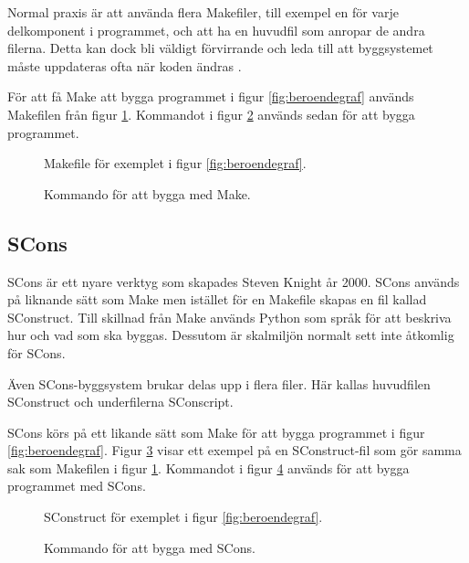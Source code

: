 Normal praxis är att använda flera Makefiler, till exempel en för varje delkomponent i programmet, och att ha en huvudfil som anropar de andra filerna. Detta kan dock bli väldigt förvirrande och leda till att byggsystemet måste uppdateras ofta när koden ändras \citep{recursivemake}.

För att få Make att bygga programmet i figur \ref{fig:beroendegraf} används Makefilen från figur \ref{fig:makefile}. Kommandot i figur \ref{fig:makekommando} används sedan för att bygga programmet.

\begin{figure}[h!]
  
  \caption{Makefile för exemplet i figur \ref{fig:beroendegraf}.}
  \label{fig:makefile}
\end{figure}

\begin{figure}[h!]
  
  \caption{Kommando för att bygga med Make.}
  \label{fig:makekommando}
\end{figure}

\subsection{SCons}
SCons är ett nyare verktyg som skapades Steven Knight år 2000. SCons används på liknande sätt som Make men istället för en Makefile skapas en fil kallad SConstruct. Till skillnad från Make används Python som språk för att beskriva hur och vad som ska byggas. Dessutom är skalmiljön normalt sett inte åtkomlig för SCons.

Även SCons-byggsystem brukar delas upp i flera filer. Här kallas huvudfilen SConstruct och underfilerna SConscript.

SCons körs på ett likande sätt som Make för att bygga programmet i figur \ref{fig:beroendegraf}. Figur \ref{fig:sconstruct} visar ett exempel på en SConstruct-fil som gör samma sak som Makefilen i figur \ref{fig:makefile}. Kommandot i figur \ref{fig:sconskommando} används för att bygga programmet med SCons.

\begin{figure}[h!]
  
  \caption{SConstruct för exemplet i figur \ref{fig:beroendegraf}.}
  \label{fig:sconstruct}
\end{figure}

\begin{figure}[h!]
  
  \caption{Kommando för att bygga med SCons.}
  \label{fig:sconskommando}
\end{figure}
